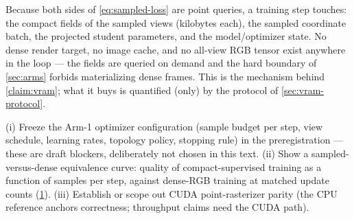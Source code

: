 Because both sides of \cref{eq:sampled-loss} are point queries, a training step touches:
the compact fields of the sampled views (kilobytes each), the sampled coordinate batch, the
projected student parameters, and the model/optimizer state.  No dense render target, no
image cache, and no all-view RGB tensor exist anywhere in the loop --- the fields are queried
on demand and the hard boundary of \cref{sec:arms} forbids materializing dense frames.  This
is the mechanism behind \cref{claim:vram}; what it buys is quantified (only) by the protocol
of \cref{sec:vram-protocol}.

\begin{ToShowBlock}
(i) Freeze the Arm-1 optimizer configuration (sample budget per step, view schedule,
learning rates, topology policy, stopping rule) in the preregistration --- these are draft
blockers, deliberately not chosen in this text.
(ii) Show a sampled-versus-dense equivalence curve: quality of compact-supervised training as
a function of samples per step, against dense-RGB training at matched update counts
(\cref{fig:sample-budget}).
(iii) Establish or scope out CUDA point-rasterizer parity (the CPU reference anchors
correctness; throughput claims need the CUDA path).
\end{ToShowBlock}

\begin{figure}[t]
  \centering
  \caption{}
  \label{fig:sample-budget}
\end{figure}
